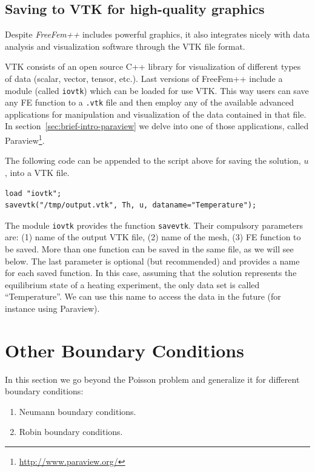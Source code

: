 \documentclass[12pt]{article}
\newcommand{\FF}{\textit{FreeFem++}\xspace}
\begin{document}
\subsection{Saving to VTK for high-quality graphics}

Despite \FF includes powerful graphics, it also integrates nicely with
data analysis and visualization software
through the VTK file format.

VTK consists of an open source C++ library for visualization of
different types of data (scalar, vector, tensor, etc.). Last versions
of FreeFem++ include a module (called \texttt{iovtk}) which can be
loaded for use VTK. This way users can save any FE function to a
\texttt{.vtk} file and then employ any of the available advanced
applications for manipulation and visualization of the data contained
in that file. In section~\ref{sec:brief-intro-paraview} we delve into
one of those applications, called
Paraview\footnote{\url{http://www.paraview.org/}}.

The following code can be appended to the script above for saving the
solution, $u$, into a VTK file.

\begin{lstlisting}
load "iovtk";
savevtk("/tmp/output.vtk", Th, u, dataname="Temperature");
\end{lstlisting}

The module \texttt{iovtk} provides the function
\texttt{savevtk}. Their compulsory parameters are: (1) name of the
output VTK file, (2) name of the mesh, (3) FE function to be
saved. More than one function can be saved in the same file, as we
will see below. The last parameter is optional (but recommended) and
provides a name for each saved function. In this case, assuming that
the solution represents the equilibrium state of a heating experiment,
the only data set is called ``Temperature''. We can use this name to
access the data in the future (for instance using Paraview).


\section{Other Boundary Conditions}
\label{sec:complex-problems}

In this section we go beyond the Poisson problem and generalize it for different boundary conditions:
\begin{enumerate}
\item Neumann boundary conditions.
\item Robin boundary conditions.
\end{enumerate}
\end{document}
